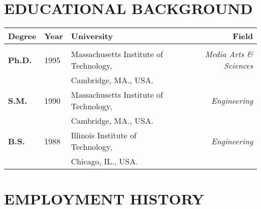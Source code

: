 
\maketitle

\vspace{-.3in}
\begin{small}
\tableofcontents
\end{small}
\newpage

\setlength{\parskip}{1pt}
\section*{EDUCATIONAL BACKGROUND}
\label{sec:educational}
\begin{center}
\begin{tabular}{lllr}

{\bf Degree} & {\bf Year} & {\bf University}\hspace{2.0in} & {\bf Field} \\
\hline \\[\tabitemskip]

\textbf{Ph.D.} & 1995 & Massachusetts Institute of Technology, &
{\sl Media Arts \& Sciences}\\
& & Cambridge, MA., USA. \\[\tabitemskip]
\textbf{S.M.} &  1990 & Massachusetts Institute of Technology, &
{\sl Engineering}\\
& & Cambridge, MA., USA.\\[\tabitemskip]
\textbf{B.S.} & 1988 & Illinois Institute of Technology, &
{\sl Engineering} \\
& & Chicago, IL., USA.
\end{tabular}
\end{center}

\bigskip

\section*{EMPLOYMENT HISTORY}
\label{sec:employment}

